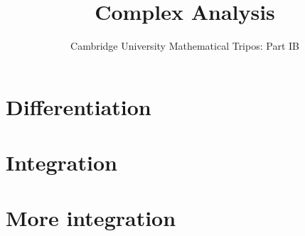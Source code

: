\documentclass{article}
\title{Complex Analysis}
\author{Cambridge University Mathematical Tripos: Part IB}
\begin{document}
\maketitle

\tableofcontentsnewpage{}

\section{Differentiation}

\section{Integration}

\section{More integration}

\end{document}
